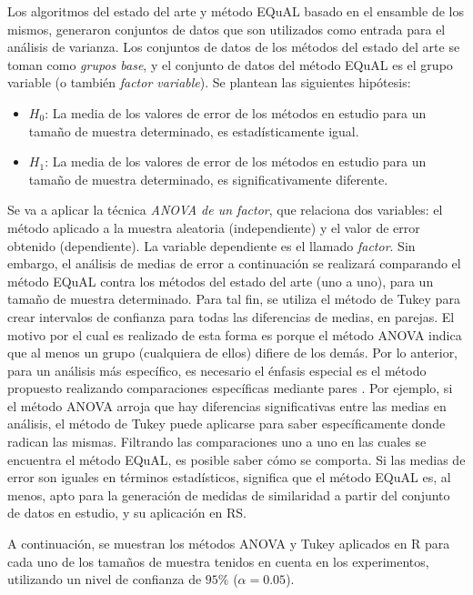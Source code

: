 \bigskip Los algoritmos del estado del arte y método EQuAL basado en el ensamble de los mismos, generaron conjuntos de datos que son utilizados como entrada para el análisis de varianza. Los conjuntos de datos de los métodos del estado del arte se toman como \textit{grupos base}, y el conjunto de datos del método EQuAL es el grupo variable (o también \textit{factor variable}). Se plantean las siguientes hipótesis:
\begin{itemize}
	\item \textbf{\(H_0\)}: La media de los valores de error de los métodos en estudio para un tamaño de muestra determinado, es estadísticamente igual.
	\item \textbf{\(H_1\)}: La media de los valores de error de los métodos en estudio para un tamaño de muestra determinado, es significativamente diferente.
\end{itemize}

\bigskip Se va a aplicar la técnica \textit{ANOVA de un factor}, que relaciona dos variables: el método aplicado a la muestra aleatoria (independiente) y el valor de error obtenido (dependiente). La variable dependiente es el llamado \textit{factor}. Sin embargo, el análisis de medias de error a continuación se realizará comparando el método EQuAL contra los métodos del estado del arte (uno a uno), para un tamaño de muestra determinado. Para tal fin, se utiliza el método de Tukey para crear intervalos de confianza para todas las diferencias de medias, en parejas. El motivo por el cual es realizado de esta forma es porque el método ANOVA indica que al menos un grupo (cualquiera de ellos) difiere de los demás. Por lo anterior, para un análisis más específico, es necesario el énfasis especial es el método propuesto realizando comparaciones específicas mediante pares \citep{abdi2010tukey}. Por ejemplo, si el método ANOVA arroja que hay diferencias significativas entre las medias en análisis, el método de Tukey puede aplicarse para saber específicamente donde radican las mismas. Filtrando las comparaciones uno a uno en las cuales se encuentra el método EQuAL, es posible saber cómo se comporta. Si las medias de error son iguales en términos estadísticos, significa que el método EQuAL es, al menos, apto para la generación de medidas de similaridad a partir del conjunto de datos en estudio, y su aplicación en RS.

\bigskip A continuación, se muestran los métodos ANOVA y Tukey aplicados en R para cada uno de los tamaños de muestra tenidos en cuenta en los experimentos, utilizando un nivel de confianza de \(95\%\) (\(\alpha = 0.05\)).

